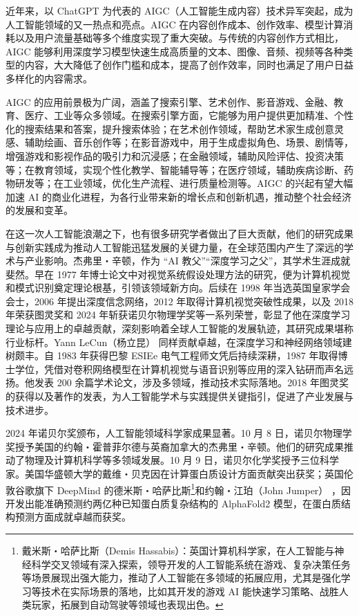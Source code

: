 近年来，以 ChatGPT 为代表的 AIGC（人工智能生成内容）技术异军突起，成为人工智能领域的又一热点和亮点。AIGC 在内容创作成本、创作效率、模型计算消耗以及用户流量基础等多个维度实现了重大突破。与传统的内容创作方式相比，AIGC 能够利用深度学习模型快速生成高质量的文本、图像、音频、视频等各种类型的内容，大大降低了创作门槛和成本，提高了创作效率，同时也满足了用户日益多样化的内容需求。


AIGC 的应用前景极为广阔，涵盖了搜索引擎、艺术创作、影音游戏、金融、教育、医疗、工业等众多领域。在搜索引擎方面，它能够为用户提供更加精准、个性化的搜索结果和答案，提升搜索体验；在艺术创作领域，帮助艺术家生成创意灵感、辅助绘画、音乐创作等；在影音游戏中，用于生成虚拟角色、场景、剧情等，增强游戏和影视作品的吸引力和沉浸感；在金融领域，辅助风险评估、投资决策等；在教育领域，实现个性化教学、智能辅导等；在医疗领域，辅助疾病诊断、药物研发等；在工业领域，优化生产流程、进行质量检测等。AIGC 的兴起有望大幅加速 AI 的商业化进程，为各行业带来新的增长点和创新机遇，推动整个社会经济的发展和变革。


在这一次人工智能浪潮之下，也有很多研究学者做出了巨大贡献，他们的研究成果与创新实践成为推动人工智能迅猛发展的关键力量，在全球范围内产生了深远的学术与产业影响。杰弗里・辛顿，作为 “AI 教父”“深度学习之父”，其学术生涯成就斐然。早在 1977 年博士论文中对视觉系统假设处理方法的研究，便为计算机视觉和模式识别奠定理论根基，引领该领域新方向。后续在 1998 年当选英国皇家学会会士，2006 年提出深度信念网络，2012 年取得计算机视觉突破性成果，以及 2018 年荣获图灵奖和 2024 年斩获诺贝尔物理学奖等一系列荣誉，彰显了他在深度学习理论与应用上的卓越贡献，深刻影响着全球人工智能的发展轨迹，其研究成果堪称行业标杆。Yann LeCun（杨立昆） 同样贡献卓越，在深度学习和神经网络领域建树颇丰。自 1983 年获得巴黎 ESIEe 电气工程师文凭后持续深耕，1987 年取得博士学位，凭借对卷积网络模型在计算机视觉与语音识别等应用的深入钻研而声名远扬。他发表 200 余篇学术论文，涉及多领域，推动技术实际落地。2018 年图灵奖的获得以及著作的发表，为人工智能学术与实践提供关键指引，促进了产业发展与技术进步。


2024 年诺贝尔奖颁布，人工智能领域科学家成果显著。10 月 8 日，诺贝尔物理学奖授予美国的约翰・霍普菲尔德与英裔加拿大的杰弗里・辛顿。他们的研究成果推动了物理及计算机科学等多领域发展。10 月 9 日，诺贝尔化学奖授予三位科学家。美国华盛顿大学的戴维・贝克因在计算蛋白质设计方面贡献突出获奖；英国伦敦谷歌旗下 DeepMind 的德米斯・哈萨比斯\footnote{戴米斯・哈萨比斯（Demis Hassabis）：英国计算机科学家，在人工智能与神经科学交叉领域有深入探索，领导开发的人工智能系统在游戏、复杂决策任务等场景展现出强大能力，推动了人工智能在多领域的拓展应用，尤其是强化学习等技术在实际场景的落地，比如其开发的游戏 AI 能快速学习策略、战胜人类玩家，拓展到自动驾驶等领域也表现出色。}和约翰・江珀（John Jumper） ，因开发出能准确预测约两亿种已知蛋白质复杂结构的 AlphaFold2 模型，在蛋白质结构预测方面成就卓越而获奖。


